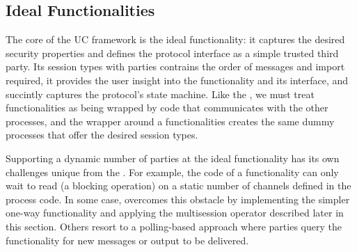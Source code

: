 \subsection{Ideal Functionalities}
The core of the UC framework is the ideal functionality: it captures the desired security properties and defines the protocol interface as a simple trusted third party. 
Its session types with parties contrains the order of messages and import required, it provides the user insight into the functionality and its interface, and succintly captures the protocol's state machine.
Like the \partywrapper, we must treat functionalities as being wrapped by code that communicates with the other processes, and the wrapper around a functionalities creates the same dummy processes that offer the desired session types. 

Supporting a dynamic number of parties at the ideal functionality has its own challenges unique from the \partywrapper.
For example, the code of a functionality can only wait to read (a blocking operation) on a static number of channels defined in the process code. 
In some case, \Fauth overcomes this obstacle by implementing the simpler one-way functionality \Fsmc and applying the multisession operator described later in this section. 
Others resort to a polling-based approach where parties query the functionality for new messages or output to be delivered.

